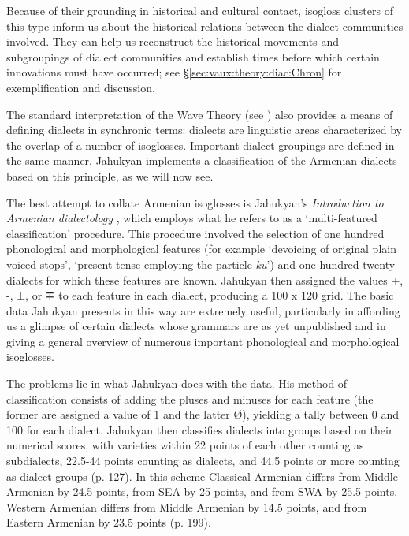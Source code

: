 \documentclass[output=paper]{langscibook}
\begin{document}
Because of their grounding in historical and cultural contact, isogloss clusters of this type inform us about the historical relations between the dialect communities involved. They can help us reconstruct the historical movements and subgroupings of dialect communities and establish times before which certain innovations must have occurred; see \S\ref{sec:vaux:theory:diac:Chron}  for exemplification and discussion.

The standard interpretation of the Wave Theory (see \citet{Petyt-1980-studydialectintroductiondialectology}) also provides a means of defining dialects in synchronic terms: dialects are linguistic areas characterized by the overlap of a number of isoglosses. Important dialect groupings are defined in the same manner. Jahukyan \citeyear{Jahukyan-1972-ArmenianDiaolectology} implements a classification of the Armenian dialects based on this principle, as we will now see.

\label{sec:vaux:theory:diac:sub:jahu}

The best attempt to collate Armenian isoglosses is Jahukyan's \textit{Introduction to Armenian dialectology} \citep{Jahukyan-1972-ArmenianDiaolectology}, which employs what he refers to as a `multi-featured classification' procedure. This procedure involved the selection of one hundred phonological and morphological features (for example `devoicing of original plain voiced stops', `present tense employing the particle \textit{ku}') and one hundred twenty dialects for which these features are known. Jahukyan then assigned the values +, -, ±, or ∓ to each feature in each dialect, producing a 100 x 120 grid. The basic data Jahukyan presents in this way are extremely useful, particularly in affording us a glimpse of certain dialects whose grammars are as yet unpublished and in giving a general overview of numerous important phonological and morphological isoglosses. 

The problems lie in what Jahukyan does with the data. His method of classification consists of adding the pluses and minuses for each feature (the former are assigned a value of 1 and the latter Ø), yielding a tally between 0 and 100 for each dialect. Jahukyan then classifies dialects into groups based on their numerical scores, with varieties within 22 points of each other counting as subdialects, 22.5-44 points counting as dialects, and 44.5 points or more counting as dialect groups (p. 127). In this scheme Classical Armenian differs from Middle Armenian by 24.5 points, from SEA by 25 points, and from SWA by 25.5 points. Western Armenian differs from Middle Armenian by 14.5 points, and from Eastern Armenian by 23.5 points (p. 199).
\end{document}
